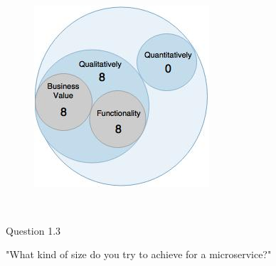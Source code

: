 \\
\begin{figure}[H]
\begin{center}
\includegraphics[scale=0.5]{figures/question1_2}
\label{fig:hybris_architecture/interview/question1-2}
\end{center}
\end{figure}
\\

\begin{shaded} Question 1.3 \end{shaded} \label{question:hybris_architecture/interview/question_1.3}
"What kind of size do you try to achieve for a microservice?"\\

